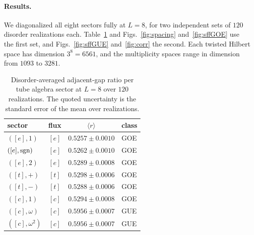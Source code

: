 \documentclass[11pt]{article}
\numberwithin{equation}{section}
\begin{document}
\paragraph{Results.}
We diagonalized all eight sectors fully at $L=8$, for two independent sets of $120$ disorder realizations each. Table~\ref{tab:S3r} and Figs.~\ref{fig:spacing} and~\ref{fig:sffGOE} use the first set, and Figs.~\ref{fig:sffGUE} and~\ref{fig:corr} the second.  Each twisted Hilbert space has dimension $3^8=6561$, and the multiplicity spaces range in dimension from $1093$ to
$3281$.

\begin{table}[H]
  \centering
  \begin{tabular}{lccl}
    \toprule
    sector & flux & $\langle r \rangle$ & class \\
    \midrule
    $([e],1)$ & $[e]$ & $0.5257 \pm 0.0010$ & GOE \\
    $([e],\mathrm{sgn})$ & $[e]$ & $0.5262 \pm 0.0010$ & GOE \\
    $([e],2)$ & $[e]$ & $0.5289 \pm 0.0008$ & GOE \\
    $([t],+)$ & $[t]$ & $0.5298 \pm 0.0006$ & GOE \\
    $([t],-)$ & $[t]$ & $0.5288 \pm 0.0006$ & GOE \\
    $([c],1)$ & $[c]$ & $0.5294 \pm 0.0008$ & GOE \\
    $([c],\omega)$ & $[c]$ & $0.5956 \pm 0.0007$ & GUE \\
    $([c],\omega^2)$ & $[c]$ & $0.5956 \pm 0.0007$ & GUE \\
    \bottomrule
  \end{tabular}
  \caption{Disorder-averaged adjacent-gap ratio per tube algebra sector at $L=8$ over $120$
  realizations. The
  quoted uncertainty is the standard error of the mean over realizations. }
  \label{tab:S3r}
\end{table}
\end{document}

